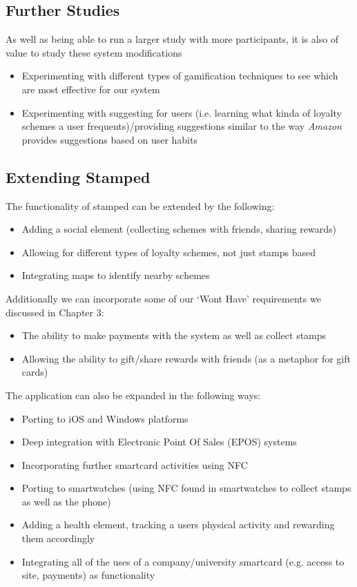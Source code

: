 \subsection{Further Studies}
As well as being able to run a larger study with more participants, it is also of value to study these system modifications
\begin{itemize}
	\item Experimenting with different types of gamification techniques to see which are most effective for our system
	\item Experimenting with suggesting for users (i.e. learning what kinda of loyalty schemes a user frequents)/providing suggestions similar to the way \emph{Amazon} provides suggestions based on user habits
\end{itemize}

\subsection{Extending Stamped}
The functionality of stamped can be extended by the following:
\begin{itemize}
	\item Adding a social element (collecting schemes with friends, sharing rewards)
	\item Allowing for different types of loyalty schemes, not just stamps based
	\item Integrating maps to identify nearby schemes
\end{itemize}

Additionally we can incorporate some of our `Wont Have' requirements we discussed in Chapter 3:
\begin{itemize}
\item The ability to make payments with the system as well as collect stamps
\item Allowing the ability to gift/share rewards with friends (as a metaphor for gift cards) 
\end{itemize}

The application can also be expanded in the following ways:
\begin{itemize}
\item Porting to iOS and Windows platforms
\item Deep integration with Electronic Point Of Sales (EPOS) systems
\item Incorporating further smartcard activities using NFC 
\item Porting to smartwatches (using NFC found in smartwatches to collect stamps as well as the phone)
\item Adding a health element, tracking a users physical activity and rewarding them accordingly
\item Integrating all of the uses of a company/university smartcard (e.g. access to site, payments) as functionality
\end{itemize} 

